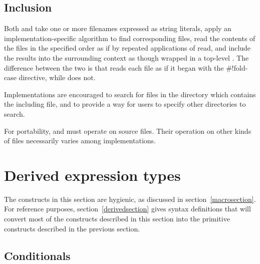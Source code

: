 \subsection{Inclusion}\unsection
\label{inclusion}
\begin{entry}{%
}

Both  and
 take one or more filenames expressed as string literals,
apply an implementation-specific algorithm to find corresponding files,
read the contents of the files in the specified order as if by repeated applications
of {\cf read}, and include the results into the surrounding context as
though wrapped in a top-level .
The difference between the two is that  reads each file
as if it began with the {\cf{}\#!fold-case} directive, while 
does not.

\begin{note}
Implementations are encouraged to search for files in the directory
which contains the including file, and to provide a way for users to
specify other directories to search.
\end{note}

\begin{note}
For portability,  and  must operate on source files.
Their operation on other kinds of files necessarily varies among
implementations.
\end{note}

\end{entry}

\section{Derived expression types}
\label{derivedexps}

The constructs in this section are hygienic, as discussed in
section~\ref{macrosection}.
For reference purposes, section~\ref{derivedsection} gives syntax definitions
that will convert most of the constructs described in this section
into the primitive constructs described in the previous section.


\subsection{Conditionals}\unsection

